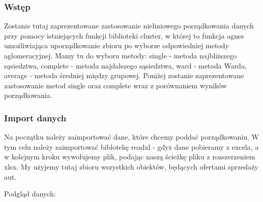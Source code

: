 \documentclass[12pt,a4paper]{report}
\begin{document}
{%

\subsubsection{Wstęp}\label{wstep}

Zostanie tutaj zaprezentowane zastosowanie nieliniowego porządkowania
danych przy pomocy istniejących funkcji biblioteki cluster, w której to
funkcja agnes umożliwiająca uporządkowanie zbioru po wyborze
odpowiedniej metody aglomeracyjnej. Mamy tu do wyboru metody: single -
metoda najbliższego sąsiedztwa, complete - metoda najdalszego
sąsiedztwa, ward - metoda Warda, average - metoda średniej między
grupowej. Poniżej zostanie zaprezentowane zastosowanie metod single oraz
complete wraz z porównaniem wyników porządkowania.

\subsubsection{Import danych}\label{import-danych}

Na początku należy zaimportować dane, które chcemy poddać porządkowaniu.
W tym celu należy zaimportować biblotekę readxl - gdyż dane pobieramy z
excela, a w kolejnym kroku wywołujemy plik, podając naszą ścieżkę pliku
z rozszerzeniem xlsx. My użyjemy tutaj zbioru wszystkich obiektów,
będących ofertami sprzedaży aut.

\begin{Shaded}
\begin{Highlighting}[]
\StringTok{ }\NormalTok{(}\NormalTok{, }
                            \NormalTok{)}
\end{Highlighting}
\end{Shaded}

Podgląd danych:

\begin{Shaded}
\begin{Highlighting}[]
\end{Highlighting}
\end{Shaded}

}
\end{document}
